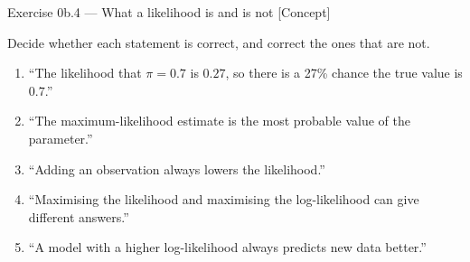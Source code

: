 \documentclass[aspectratio=169,11pt]{beamer}
\begin{document}
\begin{frame}{Exercise 0b.4 --- What a likelihood is and is not [Concept]}
  \begin{exercise}
    Decide whether each statement is correct, and correct the ones that are
    not.
    \begin{enumerate}
      \item ``The likelihood that $\pi = 0.7$ is $0.27$, so there is a 27\%
            chance the true value is $0.7$.''
      \item ``The maximum-likelihood estimate is the most probable value of
            the parameter.''
      \item ``Adding an observation always lowers the likelihood.''
      \item ``Maximising the likelihood and maximising the log-likelihood can
            give different answers.''
      \item ``A model with a higher log-likelihood always predicts new data
            better.''
    \end{enumerate}
  \end{exercise}
\end{frame}
\end{document}
